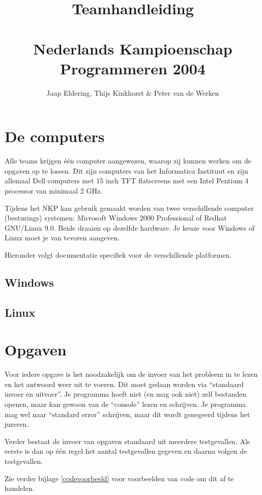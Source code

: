 \documentclass[11pt,titlepage,a4paper]{article}
\title{Teamhandleiding\\~\\Nederlands Kampioenschap Programmeren 2004}
\author{Jaap Eldering, Thijs Kinkhorst \& Peter van de Werken}
\begin{document}
\maketitle

\tableofcontents


\newpage
\section{De computers}

Alle teams krijgen \'e\'en computer aangewezen, waarop zij kunnen
werken om de opgaven op te lossen. Dit zijn computers van het
Informatica Instituut en zijn allemaal Dell computers met 15 inch TFT
flatscreens met een Intel Pentium 4 processor van minimaal 2 GHz.

Tijdens het NKP kan gebruik gemaakt worden van twee verschillende
computer (besturings) systemen: Microsoft Windows 2000 Professional of
Redhat GNU/Linux 9.0. Beide draaien op dezelfde hardware. Je keuze
voor Windows of Linux moet je van tevoren aangeven.

Hieronder volgt documentatie specifiek voor de verschillende platformen.

\subsection{Windows}
\subsection{Linux}


\newpage
\section{Opgaven}

Voor iedere opgave is het noodzakelijk om de invoer van het probleem
in te lezen en het antwoord weer uit te voeren. Dit moet gedaan worden
via ``standaard invoer en uitvoer''. Je programma hoeft niet (en mag
ook niet) zelf bestanden openen, maar kan gewoon van de ``console''
lezen en schrijven. Je programma mag wel naar ``standard error''
schrijven, maar dit wordt genegeerd tijdens het jureren.

Verder bestaat de invoer van opgaven standaard uit meerdere
testgevallen. Als eerste is dan op \'e\'en regel het aantal
testgevallen gegeven en daarna volgen de testgevallen.

Zie verder bijlage \ref{codevoorbeeld} voor voorbeelden van code om
dit af te handelen.
\end{document}
